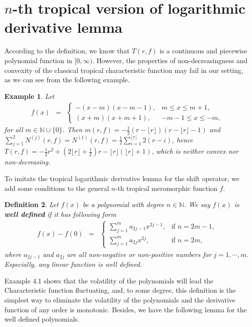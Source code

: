 \documentclass{article}
\newtheorem{defin}{Definition}[section]
\newenvironment{definition}{\begin{defin}\rm}{\end{defin}}
\newtheorem{exa}[defin]{Example}
\begin{document}
\section{$n$-th tropical version of logarithmic derivative lemma}
According to the definition, we know that $T(r, f)$ is a continuous and piecewise polynomial function in $[0, \infty)$. However, the properties of non-decreasingness and convexity of the classical tropical characteristic function  may fail in our setting, as we can see from the following example.
\begin{exa}Let
    \begin{eqnarray*}
        f(x)&=& \left\{\begin{array}{ll}
         -(x-m)(x-m-1), & m\leq x\leq m+1,\\
         (x+m)(x+m+1), & -m-1\leq x \leq -m,
         \end{array}\right.
    \end{eqnarray*}
    for all $m\in\mathbb{N}\cup\{0\}$. Then $m(r, f)=-\frac{1}{2}(r-\lfloor r\rfloor)(r-\lfloor r\rfloor-1)$ and $\sum_{j=1}^{2}N^{(j)}(r, f)=N^{(1)}(r, f)=\frac{1}{2}\sum_{i=1}^{\lfloor r\rfloor}2(r-i)$, hence $T(r, f)=-\frac{1}{2}r^{2}+(2\lfloor r\rfloor+\frac{1}{2})r-\lfloor r\rfloor(\lfloor r\rfloor+1)$, which is neither convex nor non-decreasing.
\end{exa}

To imitate the tropical logarithmic derivative lemma for the shift operator, we add some conditions to the general $n$-th tropical meromorphic function $f$.

\begin{definition}\label{def4.2}
Let $f(x)$ be a polynomial with degree $n\in\mathbb{N}$. We say $f(x)$ is \textbf{well defined} if it has following form
\begin{eqnarray*}
    f(x)-f(0)&=&\left\{\begin{array}{ll}
         \sum_{j=1}^{m}a_{2j-1}x^{2j-1}, & \text{if }n=2m-1,\\
         \sum_{j=1}^{m}a_{2j}x^{2j}, & \text{if } n=2m,
         \end{array}\right.
\end{eqnarray*}
where $a_{2j-1}$ and $a_{2j}$ are all non-negative or non-positive numbers for $j=1, \cdots, m$. Especially, any linear function is well defined.
\end{definition}

Example 4.1 shows that the volatility of the polynomials will lead the Characteristic function fluctuating, and, to some degree, this definition is the simplest way to eliminate the volatility of the polynomials and the derivative function of any order is monotonic. Besides, we have the following lemma for the well defined polynomials.
\end{document}
